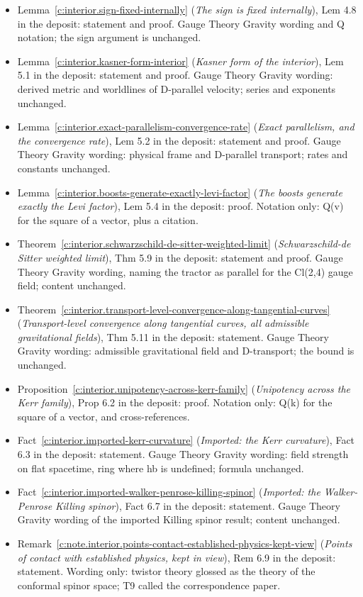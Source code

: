 \documentclass[11pt]{article}
\theoremstyle{definition}
\theoremstyle{plain}
\begin{document}
\begin{itemize}
\item Lemma~\ref{c:interior.sign-fixed-internally} (\emph{The sign is fixed internally}), Lem 4.8 in the deposit: statement and proof. Gauge Theory Gravity wording and Q notation; the sign argument is unchanged.
\item Lemma~\ref{c:interior.kasner-form-interior} (\emph{Kasner form of the interior}), Lem 5.1 in the deposit: statement and proof. Gauge Theory Gravity wording: derived metric and worldlines of D-parallel velocity; series and exponents unchanged.
\item Lemma~\ref{c:interior.exact-parallelism-convergence-rate} (\emph{Exact parallelism, and the convergence rate}), Lem 5.2 in the deposit: statement and proof. Gauge Theory Gravity wording: physical frame and D-parallel transport; rates and constants unchanged.
\item Lemma~\ref{c:interior.boosts-generate-exactly-levi-factor} (\emph{The boosts generate exactly the Levi factor}), Lem 5.4 in the deposit: proof. Notation only: Q(v) for the square of a vector, plus a citation.
\item Theorem~\ref{c:interior.schwarzschild-de-sitter-weighted-limit} (\emph{Schwarzschild-de Sitter weighted limit}), Thm 5.9 in the deposit: statement and proof. Gauge Theory Gravity wording, naming the tractor as parallel for the Cl(2,4) gauge field; content unchanged.
\item Theorem~\ref{c:interior.transport-level-convergence-along-tangential-curves} (\emph{Transport-level convergence along tangential curves, all admissible gravitational fields}), Thm 5.11 in the deposit: statement. Gauge Theory Gravity wording: admissible gravitational field and D-transport; the bound is unchanged.
\item Proposition~\ref{c:interior.unipotency-across-kerr-family} (\emph{Unipotency across the Kerr family}), Prop 6.2 in the deposit: proof. Notation only: Q(k) for the square of a vector, and cross-references.
\item Fact~\ref{c:interior.imported-kerr-curvature} (\emph{Imported: the Kerr curvature}), Fact 6.3 in the deposit: statement. Gauge Theory Gravity wording: field strength on flat spacetime, ring where hb is undefined; formula unchanged.
\item Fact~\ref{c:interior.imported-walker-penrose-killing-spinor} (\emph{Imported: the Walker-Penrose Killing spinor}), Fact 6.7 in the deposit: statement. Gauge Theory Gravity wording of the imported Killing spinor result; content unchanged.
\item Remark~\ref{c:note.interior.points-contact-established-physics-kept-view} (\emph{Points of contact with established physics, kept in view}), Rem 6.9 in the deposit: statement. Wording only: twistor theory glossed as the theory of the conformal spinor space; T9 called the correspondence paper.
\end{itemize}
\end{document}
